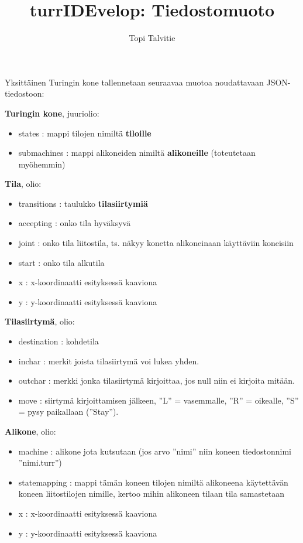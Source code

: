 \documentclass[a4paper, 11pt, finnish]{article}
\author{Topi Talvitie}
\title{turrIDEvelop: Tiedostomuoto}
\begin{document}
\maketitle

Yksittäinen Turingin kone tallennetaan seuraavaa muotoa noudattavaan
JSON-tiedostoon:

\textbf{Turingin kone}, juuriolio:
\begin{itemize}
\item states : mappi tilojen nimiltä \textbf{tiloille}
\item submachines : mappi alikoneiden nimiltä \textbf{alikoneille} (toteutetaan
myöhemmin)
\end{itemize}

\textbf{Tila}, olio:
\begin{itemize}
\item transitions : taulukko \textbf{tilasiirtymiä}
\item accepting : onko tila hyväksyvä
\item joint : onko tila liitostila, ts. näkyy konetta alikoneinaan käyttäviin
koneisiin
\item start : onko tila alkutila
\item x : x-koordinaatti esityksessä kaaviona
\item y : y-koordinaatti esityksessä kaaviona
\end{itemize}

\textbf{Tilasiirtymä}, olio:
\begin{itemize}
\item destination : kohdetila
\item inchar : merkit joista tilasiirtymä voi lukea yhden.
\item outchar : merkki jonka tilasiirtymä kirjoittaa, jos null niin ei
kirjoita mitään.
\item move : siirtymä kirjoittamisen jälkeen, ''L'' = vasemmalle, ''R'' =
oikealle, ''S'' = pysy paikallaan (''Stay'').
\end{itemize}

\textbf{Alikone}, olio:
\begin{itemize}
\item machine : alikone jota kutsutaan (jos arvo ''nimi'' niin koneen
tiedostonnimi ''nimi.turr'')
\item statemapping : mappi tämän koneen tilojen nimiltä alikoneena käytettävän
koneen liitostilojen nimille, kertoo mihin alikoneen tilaan tila samastetaan
\item x : x-koordinaatti esityksessä kaaviona
\item y : y-koordinaatti esityksessä kaaviona
\end{itemize}
\end{document}
